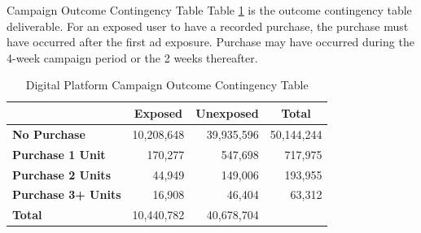 \documentclass[pdf]{beamer}
\theoremstyle{remark}
\theoremstyle{definition}
\begin{document}
\begin{frame}[t]{Campaign Outcome Contingency Table}
Table \ref{tab:adcampoutct} is the outcome contingency table deliverable. For an exposed user to have a recorded purchase, the purchase must have occurred after the first ad exposure.  Purchase may have occurred during the 4-week campaign period or the 2 weeks thereafter. \\
\vspace{1.5ex}
\begin{table}[htbp]
  \centering
  \captionsetup{justification=centering}
    \begin{tabular}{|l|r|r|r}
\cmidrule{2-4}    \multicolumn{1}{r|}{} & \multicolumn{1}{c|}{\cellcolor[rgb]{ .851,  .882,  .949}\textbf{Exposed}} & \multicolumn{1}{c|}{\cellcolor[rgb]{ .851,  .882,  .949}\textbf{Unexposed}} & \multicolumn{1}{c|}{\cellcolor[rgb]{ .851,  .882,  .949}\textbf{Total}} \\
    \midrule
    \rowcolor[rgb]{ .851,  .882,  .949} \textbf{No Purchase} & \cellcolor[rgb]{ 1,  1,  1}10,208,648 & \cellcolor[rgb]{ 1,  1,  1}39,935,596 & \multicolumn{1}{r|}{\cellcolor[rgb]{ 1,  1,  1}50,144,244} \\
    \rowcolor[rgb]{ .851,  .882,  .949} \textbf{Purchase 1 Unit} & \cellcolor[rgb]{ 1,  1,  1}170,277 & \cellcolor[rgb]{ 1,  1,  1}547,698 & \multicolumn{1}{r|}{\cellcolor[rgb]{ 1,  1,  1}717,975} \\
    \rowcolor[rgb]{ .851,  .882,  .949} \textbf{Purchase 2 Units} & \cellcolor[rgb]{ 1,  1,  1}44,949 & \cellcolor[rgb]{ 1,  1,  1}149,006 & \multicolumn{1}{r|}{\cellcolor[rgb]{ 1,  1,  1}193,955} \\
    \rowcolor[rgb]{ .851,  .882,  .949} \textbf{Purchase 3+ Units} & \cellcolor[rgb]{ 1,  1,  1}16,908 & \cellcolor[rgb]{ 1,  1,  1}46,404 & \multicolumn{1}{r|}{\cellcolor[rgb]{ 1,  1,  1}63,312} \\
    \midrule
    \rowcolor[rgb]{ .851,  .882,  .949} \textbf{Total} & \cellcolor[rgb]{ 1,  1,  1}10,440,782 & \cellcolor[rgb]{ 1,  1,  1}40,678,704 & \cellcolor[rgb]{ 1,  1,  1} \\
\cmidrule{1-3}    \end{tabular}%
  \caption{Digital Platform Campaign Outcome Contingency Table}
  \label{tab:adcampoutct}%
\end{table}%
\end{frame}
\end{document}
